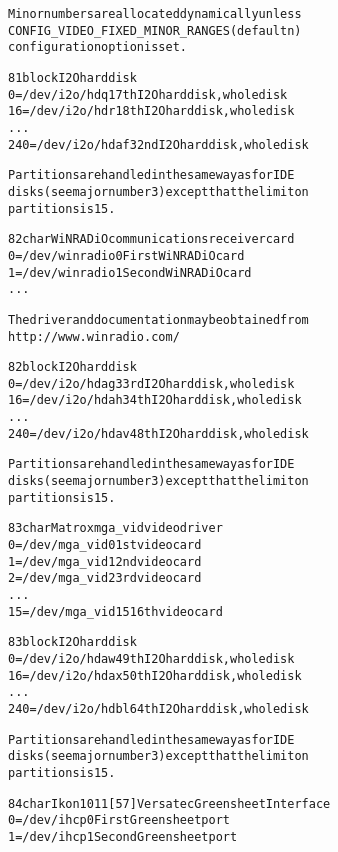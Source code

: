 \documentclass[a4paper,8pt,english]{sphinxmanual}
\begin{document}
\begin{alltt}
                Minor numbers are allocated dynamically unless
                CONFIG\_VIDEO\_FIXED\_MINOR\_RANGES (default n)
                configuration option is set.

  81 block      I2O hard disk
                  0 = /dev/i2o/hdq      17th I2O hard disk, whole disk
                 16 = /dev/i2o/hdr      18th I2O hard disk, whole disk
                    ...
                240 = /dev/i2o/hdaf     32nd I2O hard disk, whole disk

                Partitions are handled in the same way as for IDE
                disks (see major number 3) except that the limit on
                partitions is 15.

  82 char       WiNRADiO communications receiver card
                  0 = /dev/winradio0    First WiNRADiO card
                  1 = /dev/winradio1    Second WiNRADiO card
                    ...

                The driver and documentation may be obtained from
                http://www.winradio.com/

  82 block      I2O hard disk
                  0 = /dev/i2o/hdag     33rd I2O hard disk, whole disk
                 16 = /dev/i2o/hdah     34th I2O hard disk, whole disk
                    ...
                240 = /dev/i2o/hdav     48th I2O hard disk, whole disk

                Partitions are handled in the same way as for IDE
                disks (see major number 3) except that the limit on
                partitions is 15.

  83 char       Matrox mga\_vid video driver
                 0 = /dev/mga\_vid0      1st video card
                 1 = /dev/mga\_vid1      2nd video card
                 2 = /dev/mga\_vid2      3rd video card
                  ...
                15 = /dev/mga\_vid15     16th video card

  83 block      I2O hard disk
                  0 = /dev/i2o/hdaw     49th I2O hard disk, whole disk
                 16 = /dev/i2o/hdax     50th I2O hard disk, whole disk
                    ...
                240 = /dev/i2o/hdbl     64th I2O hard disk, whole disk

                Partitions are handled in the same way as for IDE
                disks (see major number 3) except that the limit on
                partitions is 15.

  84 char       Ikon 1011{[}57{]} Versatec Greensheet Interface
                  0 = /dev/ihcp0        First Greensheet port
                  1 = /dev/ihcp1        Second Greensheet port


\end{alltt}
\end{document}
